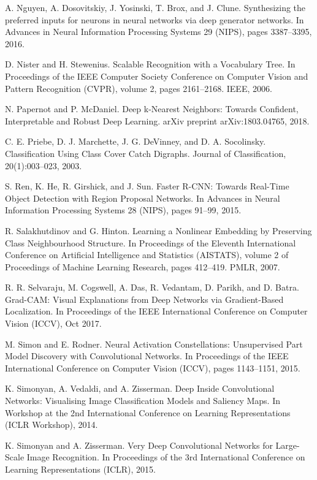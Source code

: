 \documentclass{article}
\theoremstyle{definition}
\theoremstyle{remark}
\begin{document}
\begin{thebibliography}{}
 A. Nguyen, A. Dosovitskiy, J. Yosinski, T. Brox, and J. Clune. Synthesizing the preferred inputs for neurons in neural networks via deep generator networks. In Advances in Neural Information Processing Systems 29 (NIPS), pages 3387–3395, 2016.

 D. Nister and H. Stewenius. Scalable Recognition with a Vocabulary Tree. In Proceedings of the IEEE Computer Society Conference on Computer Vision and Pattern Recognition (CVPR), volume 2, pages 2161–2168. IEEE, 2006.

 N. Papernot and P. McDaniel. Deep k-Nearest Neighbors: Towards Confident, Interpretable and Robust Deep Learning. arXiv preprint arXiv:1803.04765, 2018.

 C. E. Priebe, D. J. Marchette, J. G. DeVinney, and D. A. Socolinsky. Classification Using Class Cover Catch Digraphs. Journal of Classification, 20(1):003–023, 2003.

 S. Ren, K. He, R. Girshick, and J. Sun. Faster R-CNN: Towards Real-Time Object Detection with Region Proposal Networks. In Advances in Neural Information Processing Systems 28 (NIPS), pages 91–99, 2015.

 R. Salakhutdinov and G. Hinton. Learning a Nonlinear Embedding by Preserving Class Neighbourhood Structure. In Proceedings of the Eleventh International Conference on Artificial Intelligence and Statistics (AISTATS), volume 2 of Proceedings of Machine Learning Research, pages 412–419. PMLR, 2007.

 R. R. Selvaraju, M. Cogswell, A. Das, R. Vedantam, D. Parikh, and D. Batra. Grad-CAM: Visual Explanations from Deep Networks via Gradient-Based Localization. In Proceedings of the IEEE International Conference on Computer Vision (ICCV), Oct 2017.

 M. Simon and E. Rodner. Neural Activation Constellations: Unsupervised Part Model Discovery with Convolutional Networks. In Proceedings of the IEEE International Conference on Computer Vision (ICCV), pages 1143–1151, 2015.

 K. Simonyan, A. Vedaldi, and A. Zisserman. Deep Inside Convolutional Networks: Visualising Image Classification Models and Saliency Maps. In Workshop at the 2nd International Conference on Learning Representations (ICLR Workshop), 2014.

 K. Simonyan and A. Zisserman. Very Deep Convolutional Networks for Large-Scale Image Recognition. In Proceedings of the 3rd International Conference on Learning Representations (ICLR), 2015.


\end{thebibliography}
\end{document}
